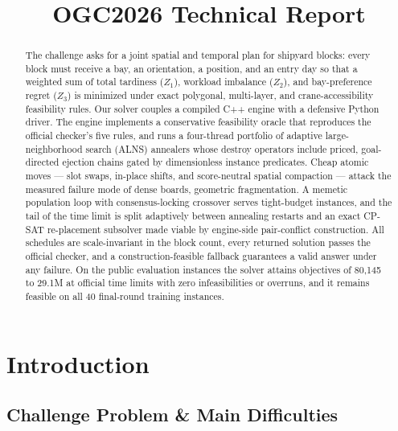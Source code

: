 \documentclass[runningheads]{llncs}
\begin{document}
\title{OGC2026 Technical Report}
\maketitle

\begin{abstract}
The challenge asks for a joint spatial and temporal plan for shipyard blocks:
every block must receive a bay, an orientation, a position, and an entry day so
that a weighted sum of total tardiness ($Z_1$), workload imbalance ($Z_2$), and
bay-preference regret ($Z_3$) is minimized under exact polygonal, multi-layer,
and crane-accessibility feasibility rules. Our solver couples a compiled C++
engine with a defensive Python driver. The engine implements a conservative
feasibility oracle that reproduces the official checker's five rules, and runs
a four-thread portfolio of adaptive large-neighborhood search (ALNS) annealers
whose destroy operators include priced, goal-directed ejection chains gated by
dimensionless instance predicates. Cheap atomic moves --- slot swaps,
in-place shifts, and score-neutral spatial compaction --- attack the measured
failure mode of dense boards, geometric fragmentation. A memetic population
loop with consensus-locking crossover serves tight-budget instances, and the
tail of the time limit is split adaptively between annealing restarts and an
exact CP-SAT re-placement subsolver made viable by engine-side pair-conflict
construction. All schedules are scale-invariant in the block count, every
returned solution passes the official checker, and a construction-feasible
fallback guarantees a valid answer under any failure. On the public evaluation
instances the solver attains objectives of 80{,}145 to 29.1M at official time
limits with zero infeasibilities or overruns, and it remains feasible on all
40 final-round training instances.
\end{abstract}

\section{Introduction}

\subsection{Challenge Problem \& Main Difficulties}
\end{document}
